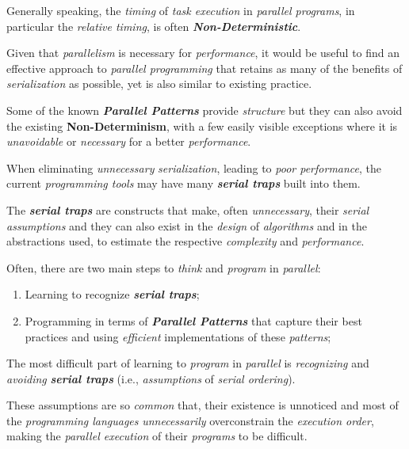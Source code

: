 Generally speaking, the \emph{timing} of \emph{task execution} in \emph{parallel programs}, in particular the \emph{relative timing}, is often \textbf{\emph{Non-Deterministic}}.

Given that \emph{parallelism} is necessary for \emph{performance}, it would be useful to find an effective approach to \emph{parallel programming} that retains as many of the benefits of \emph{serialization} as possible, yet is also similar to existing practice.

Some of the known \textbf{\emph{Parallel Patterns}} provide \emph{structure} but they can also avoid the existing \textbf{Non-Determinism}, with a few easily visible exceptions where it is \emph{unavoidable} or \emph{necessary} for a better \emph{performance}.

When eliminating \emph{unnecessary} \emph{serialization}, leading to \emph{poor performance}, the current \emph{programming tools} may have many \textbf{\emph{serial traps}} built into them.

\newpage

\noindent The \textbf{\emph{serial traps}} are constructs that make, often \emph{unnecessary}, their \emph{serial assumptions} and they can also exist in the \emph{design} of \emph{algorithms} and in the abstractions used, to estimate the respective \emph{complexity} and \emph{performance}.

\vspace{0.35cm}

\noindent Often, there are two main steps to \emph{think} and \emph{program} in \emph{parallel}:
\begin{enumerate}
    \vspace{-0.2cm}
    \item Learning to recognize \textbf{\emph{serial traps}};
    \vspace{-0.2cm}
    \item Programming in terms of \textbf{\emph{Parallel Patterns}} that capture their best practices and using \emph{efficient} implementations of these \emph{patterns};
\end{enumerate}

\noindent The most difficult part of learning to \emph{program} in \emph{parallel} is \emph{recognizing} and \emph{avoiding} \textbf{\emph{serial traps}} (i.e., \emph{assumptions} of \emph{serial ordering}).

These assumptions are so \emph{common} that, their existence is unnoticed and most of the \emph{programming languages} \emph{unnecessarily} overconstrain the \emph{execution order}, making the \emph{parallel execution} of their \emph{programs} to be difficult.

